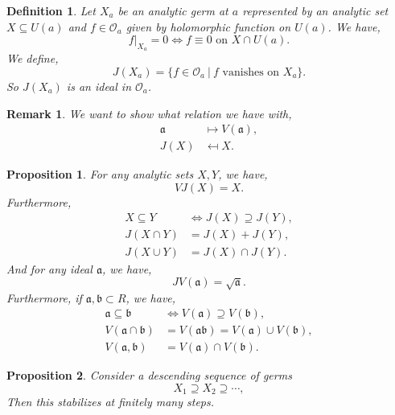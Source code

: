 \documentclass{article}
\newtheorem{proposition}{Proposition}[section]
\newtheorem{definition}{Definition}[section]
\newtheorem{remark}{Remark}[section]
\newcommand{\sep}[0]{\:|\:}
\newcommand{\Ouv}[0]{\mathcal{O}}
\begin{document}
\begin{definition}
  Let $X_a$ be an analytic germ at $a$ represented by an analytic set $X\subseteq U(a)$ and $f\in\Ouv_a$ given by holomorphic function on $U(a)$. We have,
  \begin{equation*}
    f|_{X_a} = 0\Leftrightarrow f\equiv 0\text{ on } X\cap U(a).
  \end{equation*} 
  We define,
  \begin{equation*}
    J(X_a) = \{f\in\Ouv_a\sep \text{$f$ vanishes on } X_a\}.
  \end{equation*}
  So $J(X_a)$ is an ideal in $\Ouv_a$.
\end{definition}

\begin{remark}
  We want to show what relation we have with,
  \begin{align*}
    \mathfrak{a}&\mapsto V(\mathfrak{a}),\\
    J(X) &\mapsfrom X.
  \end{align*}
\end{remark}

\begin{proposition}
  \label{proposition_6_3}
  For any analytic sets $X,Y$, we have,
  \begin{equation*}
  VJ(X) = X.
  \end{equation*}
  Furthermore, 
  \begin{align*}
    X\subseteq Y&\Leftrightarrow J(X)\supseteq J(Y),\\
    J(X\cap Y) & = J(X)+J(Y),\\
    J(X\cup Y) &= J(X)\cap J(Y).
  \end{align*}
  And for any ideal $\mathfrak{a}$, we have,
  \begin{equation*}
  JV(\mathfrak{a}) = \sqrt{\mathfrak{a}}.
  \end{equation*}
  Furthermore, if $\mathfrak{a},\mathfrak{b}\subset R$, we have,
  \begin{align*}
  \mathfrak{a}\subseteq\mathfrak{b}&\Leftrightarrow V(\mathfrak{a}) \supseteq V(\mathfrak{b}),\\
  V(\mathfrak{a}\cap\mathfrak{b}) &= V(\mathfrak{a}\mathfrak{b}) = V(\mathfrak{a})\cup V(\mathfrak{b}),\\
    V(\mathfrak{a},\mathfrak{b}) &= V(\mathfrak{a})\cap V(\mathfrak{b}).
  \end{align*}
\end{proposition}

\begin{proposition}
  \label{proposition_6_4}
  Consider a descending sequence of germs 
  \begin{equation*}
    X_1\supseteq X_2\supseteq\cdots,
  \end{equation*}
  Then this stabilizes at finitely many steps.
\end{proposition}
\end{document}
